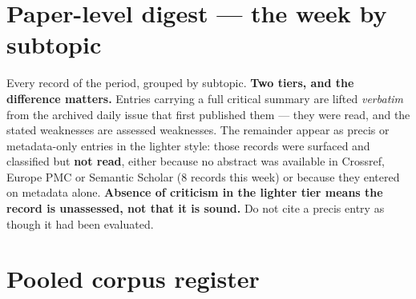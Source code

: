 \documentclass[10pt]{article}
\begin{document}
\clearpage

\section*{\sffamily\bfseries\color{Deep}Paper-level digest --- the week by subtopic}
\vspace{-1.5mm}{\color{Teal}\rule{\linewidth}{1.1pt}}\vspace{2mm}

\footnotesize
Every record of the period, grouped by subtopic. \textbf{Two tiers, and the difference
matters.} Entries carrying a full critical summary are lifted \emph{verbatim} from the
archived daily issue that first published them --- they were read, and the stated
weaknesses are assessed weaknesses. The remainder appear as precis or metadata-only
entries in the lighter style: those records were surfaced and classified but
\textbf{not read}, either because no abstract was available in Crossref, Europe PMC or
Semantic Scholar (8 records this week) or because they entered on metadata alone.
\textbf{Absence of criticism in the lighter tier means the record is unassessed, not
that it is sound.} Do not cite a precis entry as though it had been evaluated.

\vspace{3mm}



\clearpage

\section*{\sffamily\bfseries\color{Deep}Pooled corpus register}
\vspace{-1.5mm}{\color{Teal}\rule{\linewidth}{1.1pt}}\vspace{2.5mm}


\end{document}
